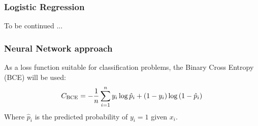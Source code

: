     \subsubsection*{Logistic Regression}
    To be continued ...

    \subsubsection*{Neural Network approach}
    As a loss function suitable for classification problems, the Binary Cross Entropy (BCE) \cite{BCE} will be used:
    \begin{align}
        {C}_\text{BCE} = -\frac{1}{n}\sum_{i=1}^{n} y_i \log{\hat{p}_i} + (1-y_i) \log{(1-\hat{p}_i)}
        \label{eq:BCE_loss_function}
    \end{align} 
    Where $\hat{p}_i$ is the predicted probability of $y_i = 1$ given $x_i$.  